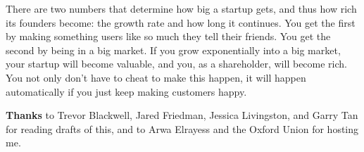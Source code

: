\documentclass[12pt]{book}
\begin{document}
There are two numbers that determine how big a startup gets, and thus
how rich its founders become: the growth rate and how long it continues.
You get the first by making something users like so much they tell their
friends. You get the second by being in a big market. If you grow
exponentially into a big market, your startup will become valuable, and
you, as a shareholder, will become rich. You not only don't have to
cheat to make this happen, it will happen automatically if you just keep
making customers happy.

\textbf{Thanks} to Trevor Blackwell, Jared Friedman, Jessica Livingston,
and Garry Tan for reading drafts of this, and to Arwa Elrayess and the
Oxford Union for hosting me.
\end{document}

